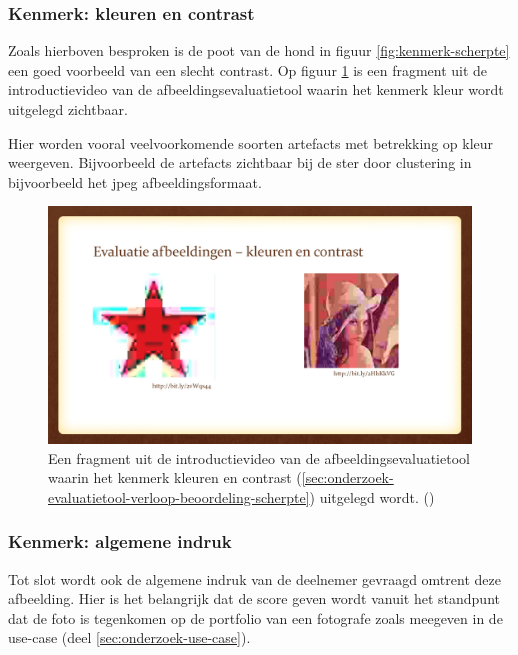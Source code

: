 \subsubsection{Kenmerk: kleuren en contrast}
\label{sec:onderzoek-evaluatietool-verloop-beoordeling-kleur}

Zoals hierboven besproken is de poot van de hond in figuur \ref{fig:kenmerk-scherpte} een goed voorbeeld van een slecht contrast. Op figuur \ref{fig:kenmerk-kleuren} is een fragment uit de introductievideo van de \gls{afbeeldingsevaluatietool} waarin het kenmerk kleur wordt uitgelegd zichtbaar. 

Hier worden vooral veelvoorkomende soorten \glspl{artefact} met betrekking op kleur weergeven. Bijvoorbeeld de \glspl{artefact} zichtbaar bij de ster door clustering in bijvoorbeeld het \gls{jpeg} \gls{afbeeldingsformaat}.

\FloatBarrier
\begin{figure}[h!]
	\includegraphics[width=\linewidth]{img/onderzoek/kleuren.png}
	\caption{Een fragment uit de introductievideo van de \gls{afbeeldingsevaluatietool} waarin het kenmerk kleuren en contrast (\ref{sec:onderzoek-evaluatietool-verloop-beoordeling-scherpte}) uitgelegd wordt. (\cite{introductievideo})}
	\label{fig:kenmerk-kleuren}
\end{figure}
\FloatBarrier

\subsubsection{Kenmerk: algemene indruk}
\label{sec:onderzoek-evaluatietool-verloop-beoordeling-algemeen}

Tot slot wordt ook de algemene indruk van de deelnemer gevraagd omtrent deze afbeelding. Hier is het belangrijk dat de score geven wordt vanuit het standpunt dat de foto is tegenkomen op de portfolio van een fotografe zoals meegeven in de \gls{use-case} (deel \ref{sec:onderzoek-use-case}).

